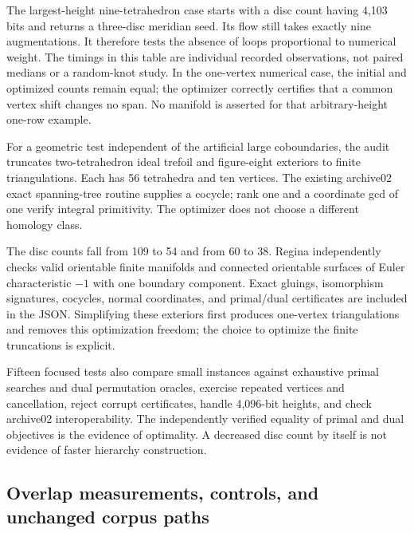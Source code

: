 

The largest-height nine-tetrahedron case starts with a disc count having
4,103 bits and returns a three-disc meridian seed. Its flow still takes
exactly nine augmentations. It therefore tests the absence of loops
proportional to numerical weight. The timings in this table are individual
recorded observations, not paired medians or a random-knot study. In the
one-vertex numerical case, the initial and optimized counts remain equal;
the optimizer correctly certifies that a common vertex shift changes no
span. No manifold is asserted for that arbitrary-height one-row example.

For a geometric test independent of the artificial large coboundaries, the
audit truncates two-tetrahedron ideal trefoil and figure-eight exteriors to
finite triangulations. Each has 56 tetrahedra and ten vertices. The existing
archive02 exact spanning-tree routine supplies a cocycle; rank one and a
coordinate gcd of one verify integral primitivity. The optimizer does not
choose a different homology class.



The disc counts fall from 109 to 54 and from 60 to 38. Regina independently
checks valid orientable finite manifolds and connected orientable surfaces
of Euler characteristic $-1$ with one boundary component. Exact gluings,
isomorphism signatures, cocycles, normal coordinates, and primal/dual
certificates are included in the JSON. Simplifying these exteriors first
produces one-vertex triangulations and removes this optimization freedom;
the choice to optimize the finite truncations is explicit.

Fifteen focused tests also compare small instances against exhaustive
primal searches and dual permutation oracles, exercise repeated vertices
and cancellation, reject corrupt certificates, handle 4,096-bit heights,
and check archive02 interoperability. The independently verified equality
of primal and dual objectives is the evidence of optimality. A decreased
disc count by itself is not evidence of faster hierarchy construction.

\subsection{Overlap measurements, controls, and unchanged corpus paths}

